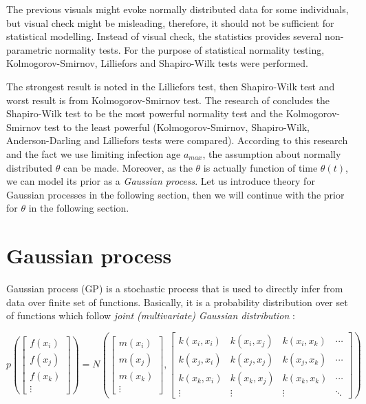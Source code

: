 \documentclass[
  digital, %
  oneside, %
  lof,     %
  lot,     %
]{fithesis4}
\begin{document}
The previous visuals might evoke normally 
distributed data for some individuals, but 
visual check might be misleading, therefore, 
it should not be sufficient for statistical 
modelling. Instead of visual check, the 
statistics provides several non-parametric 
normality tests. For the purpose of statistical normality 
testing, Kolmogorov-Smirnov, Lilliefors and 
Shapiro-Wilk tests were performed.





The strongest result is noted in the 
Lilliefors test, then Shapiro-Wilk test and 
worst result is from Kolmogorov-Smirnov test.
The research of \cite{razali2011} concludes the 
Shapiro-Wilk test to be the most powerful 
normality test and the Kolmogorov-Smirnov test 
to the least powerful (Kolmogorov-Smirnov, 
Shapiro-Wilk, Anderson-Darling and Lilliefors 
tests were compared). 
According to this research and the fact we 
use limiting infection age $a_{max}$, the 
assumption about normally distributed $\theta$ 
can be made.
Moreover, as the $\theta$ is actually function of time $\theta(t)$,
we can model its prior as a \textit{Gaussian process}.
Let us introduce theory for Gaussian processes in the
following section, then we will continue
with the prior for $\theta$ in the following section.


\section{Gaussian process}

Gaussian process (GP) is a stochastic process that is used to directly infer
from data over finite set of functions.
Basically, it is a probability distribution over set of
functions which follow \textit{joint (multivariate) Gaussian
distribution} \cite{frigola2015}:

\begin{equation}
  p\left(
    \begin{bmatrix}
      f(x_i) \\ f(x_j) \\ f(x_k) \\ \vdots
    \end{bmatrix}
  \right) = N\left(
    \begin{bmatrix}
      m(x_i) \\ m(x_j) \\ m(x_k) \\ \vdots
    \end{bmatrix},
    \begin{bmatrix}
      k(x_i, x_i) & k(x_i, x_j) & k(x_i, x_k) & \cdots \\ 
      k(x_j, x_i) & k(x_j, x_j) & k(x_j, x_k) & \cdots \\ 
      k(x_k, x_i) & k(x_k, x_j) & k(x_k, x_k) & \cdots \\ 
      \vdots & \vdots & \vdots & \ddots 
    \end{bmatrix}
  \right)
\end{equation}
\end{document}

